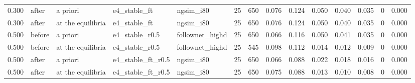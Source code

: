 \begin{table}[htbp]
{\begin{tabular}{rllllrrrrrrrrr}
0.300 & after & a priori & e4\_stable\_ft & ngsim\_i80 & 25 & 650 & 0.076 & 0.124 & 0.050 & 0.040 & 0.035 & 0 & 0.000 \\
0.300 & after & at the equilibria & e4\_stable\_ft & ngsim\_i80 & 25 & 650 & 0.076 & 0.124 & 0.050 & 0.040 & 0.035 & 0 & 0.000 \\
0.500 & before & a priori & e4\_stable\_r0.5 & follownet\_highd & 25 & 650 & 0.066 & 0.116 & 0.050 & 0.041 & 0.035 & 0 & 0.000 \\
0.500 & before & at the equilibria & e4\_stable\_r0.5 & follownet\_highd & 25 & 545 & 0.098 & 0.112 & 0.014 & 0.012 & 0.009 & 0 & 0.000 \\
0.500 & after & a priori & e4\_stable\_ft\_r0.5 & ngsim\_i80 & 25 & 650 & 0.066 & 0.088 & 0.022 & 0.018 & 0.016 & 0 & 0.000 \\
0.500 & after & at the equilibria & e4\_stable\_ft\_r0.5 & ngsim\_i80 & 25 & 650 & 0.075 & 0.088 & 0.013 & 0.010 & 0.008 & 0 & 0.000 \\
\bottomrule
\end{tabular}
}
\end{table}

